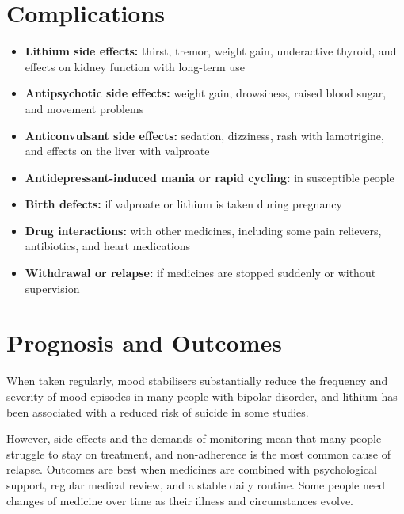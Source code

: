 \section*{Complications}
\begin{itemize}
    \item \textbf{Lithium side effects:} thirst, tremor, weight gain, underactive thyroid, and effects on kidney function with long-term use
    \item \textbf{Antipsychotic side effects:} weight gain, drowsiness, raised blood sugar, and movement problems
    \item \textbf{Anticonvulsant side effects:} sedation, dizziness, rash with lamotrigine, and effects on the liver with valproate
    \item \textbf{Antidepressant-induced mania or rapid cycling:} in susceptible people
    \item \textbf{Birth defects:} if valproate or lithium is taken during pregnancy
    \item \textbf{Drug interactions:} with other medicines, including some pain relievers, antibiotics, and heart medications
    \item \textbf{Withdrawal or relapse:} if medicines are stopped suddenly or without supervision
\end{itemize}

\section*{Prognosis and Outcomes}
When taken regularly, mood stabilisers substantially reduce the frequency and severity of mood episodes in many people with bipolar disorder, and lithium has been associated with a reduced risk of suicide in some studies.

However, side effects and the demands of monitoring mean that many people struggle to stay on treatment, and non-adherence is the most common cause of relapse. Outcomes are best when medicines are combined with psychological support, regular medical review, and a stable daily routine. Some people need changes of medicine over time as their illness and circumstances evolve.

